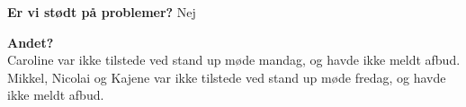 \textbf{Er vi stødt på problemer?} Nej


\textbf{Andet?} \\
Caroline var ikke tilstede ved stand up møde mandag, og havde ikke meldt afbud. \\
Mikkel, Nicolai og Kajene var ikke tilstede ved stand up møde fredag, og havde ikke meldt afbud.

\clearpage  
